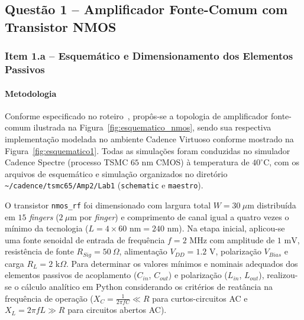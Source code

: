 \subsection{Questão 1 -- Amplificador Fonte-Comum com Transistor NMOS}

\subsubsection{Item 1.a -- Esquemático e Dimensionamento dos Elementos Passivos}

\paragraph{Metodologia}
\vspace{0.2cm}
Conforme especificado no roteiro~\cite{AMP2_1}, propôs-se a topologia de amplificador fonte-comum ilustrada na Figura~\ref{fig:esquematico_nmos}, sendo sua respectiva implementação modelada no ambiente Cadence Virtuoso conforme mostrado na Figura~\ref{fig:esquematico1}. Todas as simulações foram conduzidas no simulador Cadence Spectre (processo TSMC $65\text{ nm}$ CMOS) à temperatura de $40^\circ\text{C}$, com os arquivos de esquemático e simulação organizados no diretório \texttt{\textasciitilde/cadence/tsmc65/Amp2/Lab1} (\texttt{schematic} e \texttt{maestro}).

O transistor \texttt{nmos\_rf} foi dimensionado com largura total $W = 30\ \mu\text{m}$ distribuída em $15$ \textit{fingers} ($2\ \mu\text{m}$ por \textit{finger}) e comprimento de canal igual a quatro vezes o mínimo da tecnologia ($L = 4 \times 60\text{ nm} = 240\text{ nm}$). Na etapa inicial, aplicou-se uma fonte senoidal de entrada de frequência $f = 2\text{ MHz}$ com amplitude de $1\text{ mV}$, resistência de fonte $R_{Sig} = 50\ \Omega$, alimentação $V_{DD} = 1.2\text{ V}$, polarização $V_{Bias}$ e carga $R_L = 2\text{ k}\Omega$. Para determinar os valores mínimos e nominais adequados dos elementos passivos de acoplamento ($C_{in}$, $C_{out}$) e polarização ($L_{in}$, $L_{out}$), realizou-se o cálculo analítico em Python considerando os critérios de reatância na frequência de operação ($X_C = \frac{1}{2\pi f C} \ll R$ para curtos-circuitos AC e $X_L = 2\pi f L \gg R$ para circuitos abertos AC).


